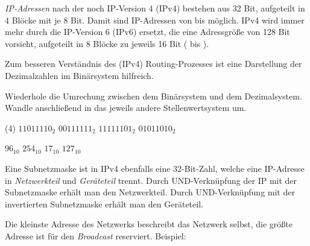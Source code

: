 \documentclass[10pt, a4paper]{arbeitsblatt}
\begin{document}
\ReiheTitel

\emph{IP-Adressen} nach der noch  IP-Version 4 (IPv4) bestehen aus 32 Bit, aufgeteilt in 4 Blöcke mit je 8 Bit. Damit sind IP-Adressen von  bis  möglich. IPv4 wird immer mehr durch die IP-Version 6 (IPv6) ersetzt, die eine Adressgröße von 128 Bit vorsieht, aufgeteilt in 8 Blöcke zu jeweils 16 Bit ( bis ).

Zum besseren Verständnis des (IPv4) Routing-Prozesses ist eine Darstellung der Dezimalzahlen im Binärsystem hilfreich.

\begin{aufgabe}
	Wiederhole die Umrechung zwischen dem Binärsystem und dem Dezimalsystem. Wandle anschließend in das jeweils andere Stellenwertsystem um.

	\begin{tasks}(4)
		\task $1101 1110_2$
		\task $0011 1111_2$
		\task $1111 1101_2$
		\task $0101 1010_2$

		\task $96_{10}$
		\task $254_{10}$
		\task $17_{10}$
		\task $127_{10}$
	\end{tasks}
\end{aufgabe}

Eine Subnetzmaske ist in IPv4 ebenfalls eine 32-Bit-Zahl, welche eine IP-Adresse in \emph{Netzwerkteil} und \emph{Geräteteil} trennt. Durch UND-Verknüpfung der IP mit der Subnetzmaske erhält man den Netzwerkteil. Durch UND-Verknüpfung mit der invertierten Subnetzmaske erhält man den Geräteteil.

Die kleinste Adresse des Netzwerks beschreibt das Netzwerk selbst, die größte Adresse ist für den \emph{Broadcast} reserviert. Beispiel:
\end{document}
